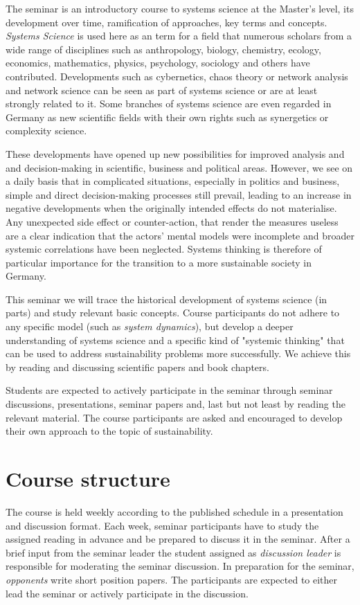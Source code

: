 \documentclass[11pt,a4paper]{article}
\begin{document}
The seminar is an introductory course to systems science at the Master's
level, its development over time, ramification of approaches, key terms and
concepts.  \emph{Systems Science} is used here as an term for a field that
numerous scholars from a wide range of disciplines such as anthropology,
biology, chemistry, ecology, economics, mathematics, physics, psychology,
sociology and others have contributed. Developments such as cybernetics, chaos
theory or network analysis and network science can be seen as part of systems
science or are at least strongly related to it.  Some branches of systems
science are even regarded in Germany as new scientific fields with their own
rights such as synergetics or complexity science.

These developments have opened up new possibilities for improved analysis and
and decision-making in scientific, business and political areas. However, we
see on a daily basis that in complicated situations, especially in politics
and business, simple and direct decision-making processes still prevail,
leading to an increase in negative developments when the originally intended
effects do not materialise. Any unexpected side effect or counter-action, that
render the measures useless are a clear indication that the actors' mental
models were incomplete and broader systemic correlations have been neglected.
Systems thinking is therefore of particular importance for the transition
to a more sustainable society in Germany.  

This seminar we will trace the historical development of systems science (in
parts) and study relevant basic concepts. Course participants do not adhere to
any specific model (such as \emph{system dynamics}), but develop a deeper
understanding of systems science and a specific kind of "systemic thinking"
that can be used to address sustainability problems more successfully. We
achieve this by reading and discussing scientific papers and book chapters.

Students are expected to actively participate in the seminar through seminar
discussions, presentations, seminar papers and, last but not least by reading
the relevant material.  The course participants are asked and encouraged to
develop their own approach to the topic of sustainability.

\section{Course structure}

The course is held weekly according to the published schedule in a
presentation and discussion format.  Each week, seminar participants have to
study the assigned reading in advance and be prepared to discuss it in the
seminar. After a brief input from the seminar leader the student assigned as
\emph{discussion leader} is responsible for moderating the seminar discussion.
In preparation for the seminar, \emph{opponents} write short position papers.
The participants are expected to either lead the seminar or actively
participate in the discussion.
\end{document}
